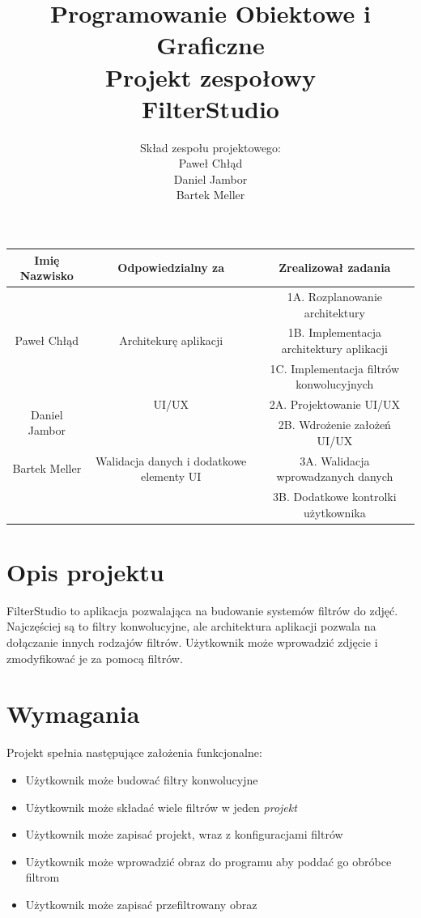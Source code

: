 \documentclass{article}
\title{Programowanie Obiektowe i Graficzne\\
Projekt zespołowy\\
\textbf{FilterStudio}}
\author{Skład zespołu projektowego: \\ Paweł Chłąd\\Daniel Jambor\\ Bartek Meller }
\begin{document}
\maketitle

\begin{center}
    \begin{tabular}{ |c|c|c| }
        \hline
        Imię Nazwisko                   & Odpowiedzialny za                        & Zrealizował zadania                      \\ \hline
        \multirow{3}{*}{Paweł Chłąd}    &                                          & 1A. Rozplanowanie architektury           \\
                                        & Architekurę aplikacji                    & 1B. Implementacja architektury aplikacji \\
                                        &                                          & 1C. Implementacja filtrów konwolucyjnych \\ \hline
        \multirow{2}{*}{Daniel Jambor}  & UI/UX                                    & 2A. Projektowanie UI/UX                  \\
                                        &                                          & 2B. Wdrożenie założeń UI/UX              \\ \hline
        Bartek Meller                   & Walidacja danych i dodatkowe elementy UI & 3A. Walidacja wprowadzanych danych      \\ 
                                        &                                          & 3B. Dodatkowe kontrolki użytkownika    \\ \hline
    \end{tabular}
\end{center}

\pagebreak


\section{Opis projektu}
FilterStudio to aplikacja pozwalająca na budowanie systemów filtrów do zdjęć. Najczęściej są to filtry konwolucyjne, ale architektura aplikacji pozwala
na dołączanie innych rodzajów filtrów. Użytkownik może wprowadzić zdjęcie i zmodyfikować je za pomocą filtrów.
\section{Wymagania}
Projekt spełnia następujące założenia funkcjonalne:
\begin{itemize}
    \item Użytkownik może budować filtry konwolucyjne
    \item Użytkownik może składać wiele filtrów w jeden \textit{projekt}
    \item Użytkownik może zapisać projekt, wraz z konfiguracjami filtrów
    \item Użytkownik może wprowadzić obraz do programu aby poddać go obróbce filtrom
    \item Użytkownik może zapisać przefiltrowany obraz 
\end{itemize}
\end{document}
